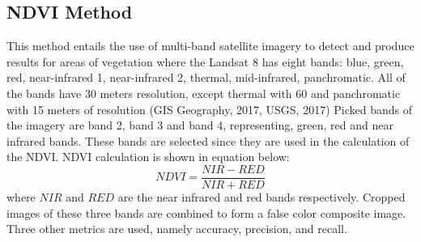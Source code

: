 \documentclass[12pt,a4paper,IEEEtran]{article}
\begin{document}




\subsection[3.4]{NDVI Method}
This method entails the use of multi-band satellite imagery to detect and produce results for areas of vegetation \cite{isprs-annals-IV-4-W4-379-2017} where the Landsat 8 has eight bands: blue, green, red, near-infrared 1, 
near-infrared 2, thermal, mid-infrared, panchromatic. All of the 
bands have 30 meters resolution, except thermal with 60 and 
panchromatic with 15 meters of resolution (GIS Geography, 
2017, USGS, 2017)
\newline Picked bands of the imagery are band 2, 
band 3 and band 4, representing, green, red and near infrared 
bands. These bands are selected since they are used in the 
calculation of the NDVI. NDVI calculation is shown in equation below:
\begin{equation}
NDVI = \frac{NIR - RED}{NIR + RED}
\end{equation}
where $NIR$ and $RED$ are the near infrared and red bands respectively.
\newline Cropped images of these three bands are combined to form a 
false color composite image. 
Three other metrics are used, namely accuracy, precision, and recall.
\end{document}
